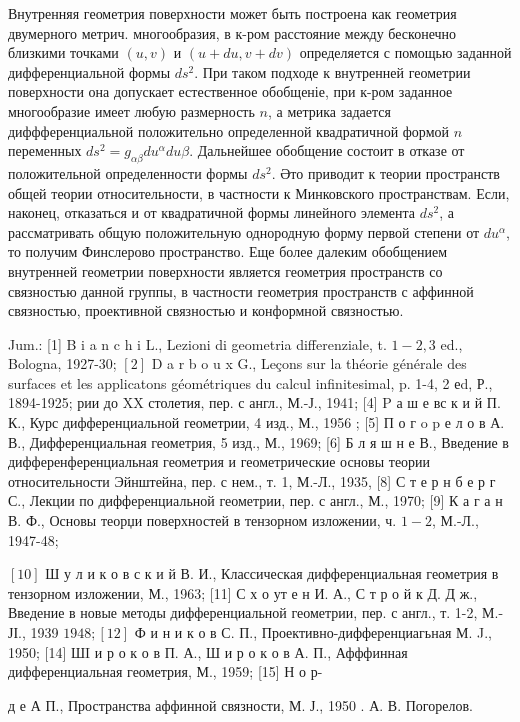 \documentclass[10pt]{article}
\begin{document}
Внутренняя геометрия поверхности может быть построена как геометрия двумерного метрич. многообразия, в к-ром расстояние между бесконечно близкими точками $(u, v)$ и $(u+d u, v+d v)$ определяется с помощью заданной дифференциальной формы $d s^{2}$. При таком подходе к внутренней геометрии поверхности она допускает естественное обобщеніе, при к-ром заданное многообразие имеет любую размерность $n$, а метрика задается диффференциальной положительно определенной квадратичной формой $n$ переменных $d s^{2}=g_{\alpha \beta} d u^{\alpha} d u \beta$. Дальнейшее обобщение состоит в отказе от положительной определенности формы $d s^{2}$. Әто приводит к теории пространств общей теории относительности, в частности к Минковского пространствам. Если, наконец, отказаться и от квадратичной формы линейного элемента $d s^{2}$, а рассматривать общую положительную однородную форму первой степени от $d u^{\alpha}$, то получим Финслерово пространство. Еще более далеким обобщением внутренней геометрии поверхности является геометрия пространств со связностью данной группы, в частности геометрия пространств с аффинной связностью, проективной связностью и конформной связностью.



Jum.: [1] B i a n c h i L., Lezioni di geometria differenziale, t. $1-2,3$ ed., Bologna, 1927-30; $[2]$ D a r b o u x G., Leçons sur la théorie générale des surfaces et les applicatons géométriques du calcul infinitesimal, p. 1-4, 2 еd, Р., 1894-1925; рии до XX столетия, пер. с англ., М.-Ј., 1941; [4] P а ш е вс к и й П. К., Курс дифференциальной геометрии, 4 изд., М., 1956 ; [5] П о г o p е л о в А. В., Дифференциальная геометрия, 5 изд., М., 1969; [6] Б л я ш н е В., Введение в дифференференциальная геометрия и геометрические основы теории относительности Эйнштейна, пер. с нем., т. 1, М.-Л., 1935, [8] С т е р н б е р г С., Лекции по дифференциальной геометрии, пер. с англ., М., 1970; [9] К а г а н В. Ф., Основы теорџи поверхностей в тензорном изложении, ч. $1-2$, М.-Л., 1947-48;

$[10]$ Ш у л и к о в с к и й В. И., Классическая дифференциальная геометрия в тензорном изложении, М., 1963; [11] С х о ут е н И. А., С т р о й к Д. Д ж., Введение в новые методы дифференциальной геометрии, пер. с англ., т. 1-2, М.-ЈІ., 1939 $1948 ;[12]$ Ф и н и к о в С. П., Проективно-дифференциагьная М. J., 1950; [14] ШI и р о к о в П. А., Ш и р о к о в А. П., Афффинная дифференциальная геометрия, М., 1959; [15] Н о р-

д е А П., Пространства аффинной связности, М. Ј., 1950 . А. В. Погорелов.
\end{document}
